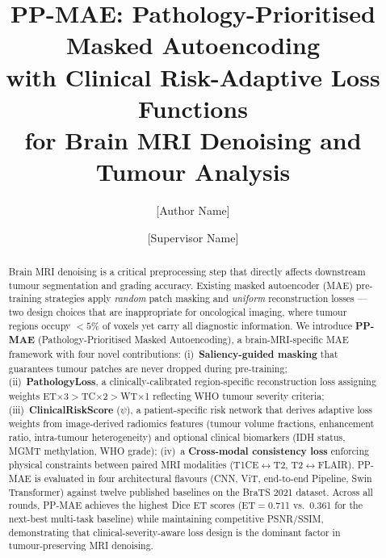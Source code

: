 \documentclass[runningheads]{llncs}
\begin{document}
\title{PP-MAE: Pathology-Prioritised Masked Autoencoding\\
       with Clinical Risk-Adaptive Loss Functions\\
       for Brain MRI Denoising and Tumour Analysis}

\author{[Author Name] \and
        [Supervisor Name]}



\maketitle

\begin{abstract}
Brain MRI denoising is a critical preprocessing step that directly affects
downstream tumour segmentation and grading accuracy. Existing masked
autoencoder (MAE) pre-training strategies apply \emph{random} patch masking
and \emph{uniform} reconstruction losses — two design choices that are
inappropriate for oncological imaging, where tumour regions occupy
$<5$\% of voxels yet carry all diagnostic information.
We introduce \textbf{PP-MAE} (Pathology-Prioritised Masked Autoencoding),
a brain-MRI-specific MAE framework with four novel contributions:
(i)~\textbf{Saliency-guided masking} that guarantees tumour patches are
never dropped during pre-training;
(ii)~\textbf{PathologyLoss}, a clinically-calibrated region-specific
reconstruction loss assigning weights ET$\times$3$>$TC$\times$2$>$WT$\times$1
reflecting WHO tumour severity criteria;
(iii)~\textbf{ClinicalRiskScore} ($\psi$), a patient-specific risk network
that derives adaptive loss weights from image-derived radiomics features
(tumour volume fractions, enhancement ratio, intra-tumour heterogeneity)
and optional clinical biomarkers (IDH status, MGMT methylation, WHO grade);
(iv)~a \textbf{Cross-modal consistency loss} enforcing physical constraints
between paired MRI modalities (T1CE$\leftrightarrow$T2, T2$\leftrightarrow$FLAIR).
PP-MAE is evaluated in four architectural flavours (CNN, ViT, end-to-end
Pipeline, Swin Transformer) against twelve published baselines on the
BraTS 2021 dataset.
Across all rounds, PP-MAE achieves the highest Dice ET scores (ET$=$0.711
vs.\ 0.361 for the next-best multi-task baseline) while maintaining competitive
PSNR/SSIM, demonstrating that clinical-severity-aware loss design is the
dominant factor in tumour-preserving MRI denoising.
\end{abstract}
\end{document}
